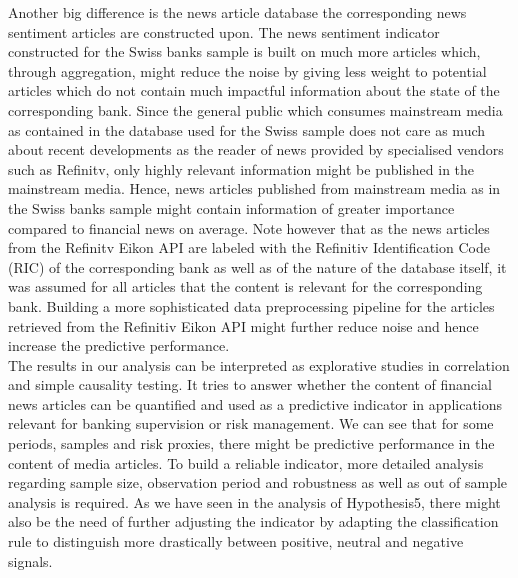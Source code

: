 Another big difference is the news article database the corresponding news sentiment articles are constructed upon. The news sentiment indicator constructed for the Swiss banks sample is built on much more articles which, through aggregation, might reduce the noise by giving less weight to potential articles which do not contain much impactful information about the state of the corresponding bank. Since the general public which consumes mainstream media as contained in the database used for the Swiss sample does not care as much about recent developments as the reader of news provided by specialised vendors such as Refinitv, only highly relevant information might be published in the mainstream media. Hence, news articles published from mainstream media as in the Swiss banks sample might contain information of greater importance compared to financial news on average. Note however that as the news articles from the Refinitv Eikon API are labeled with the Refinitiv Identification Code (RIC) of the corresponding bank as well as of the nature of the database itself, it was assumed for all articles that the content is relevant for the corresponding bank. Building a more sophisticated data preprocessing pipeline for the articles retrieved from the Refinitiv Eikon API might further reduce noise and hence increase the predictive performance. \\

The results in our analysis can be interpreted as explorative studies in correlation and simple causality testing. It tries to answer whether the content of financial news articles can be quantified and used as a predictive indicator in applications relevant for banking supervision or risk management. We can see that for some periods, samples and risk proxies, there might be predictive performance in the content of media articles. To build a reliable indicator, more detailed analysis regarding sample size, observation period and robustness as well as out of sample analysis is required. As we have seen in the analysis of \mbox{Hypothesis5}, there might also be the need of further adjusting the indicator by adapting the classification rule to distinguish more drastically between positive, neutral and negative signals. \\

